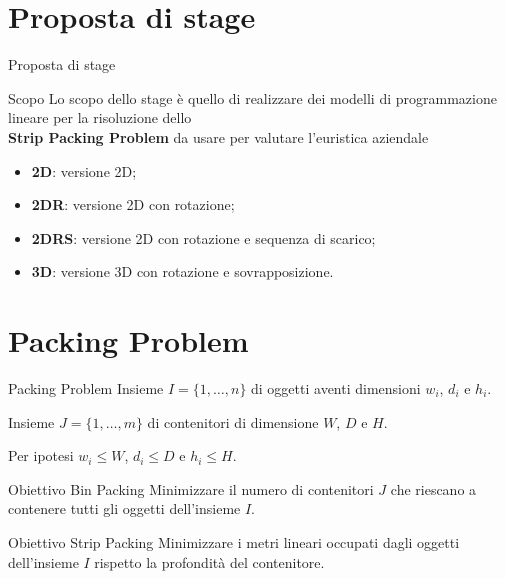 \documentclass{beamer}
\begin{document}
\section{Proposta di stage}

\begin{frame}{Proposta di stage}
	\begin{alertblock}{Scopo}
		Lo scopo dello stage \`e  quello di realizzare dei modelli di programmazione lineare per la risoluzione dello \\ \textbf{Strip Packing Problem} da usare per valutare l'euristica aziendale
	\end{alertblock}
	\begin{itemize}
		\item \textbf{2D}: versione 2D;
		\item \textbf{2DR}: versione 2D con rotazione;
		\item \textbf{2DRS}: versione 2D con rotazione e sequenza di scarico;
		\item \textbf{3D}: versione 3D con rotazione e sovrapposizione.
	\end{itemize}
\end{frame}

\section{Packing Problem}
\begin{frame}{Packing Problem}
	Insieme $I = \{1,\dots,n\}$ di oggetti aventi dimensioni $w_{i}$, $d_{i}$ e $h_{i}$.	
														
	Insieme $J = \{1,\dots,m\}$ di contenitori di dimensione $W$, $D$ e $H$.
												
	Per ipotesi $w_{i} \leq W$, $d_{i} \leq D$ e $h_{i} \leq H$.
	\vspace{.5em}
	\begin{minipage}[c]{0.45\textwidth}
		\begin{alertblock}{Obiettivo Bin Packing}
			Minimizzare il numero di contenitori $J$ che riescano a contenere tutti gli oggetti dell'insieme $I$.
		\end{alertblock}	
	\end{minipage}
	\hfill
	\begin{minipage}[c]{0.45\textwidth}
		\begin{alertblock}{Obiettivo Strip Packing}
			Minimizzare i metri lineari occupati dagli oggetti dell'insieme $I$ rispetto la profondit\`a del contenitore.
		\end{alertblock}	
	\end{minipage}
\end{frame}
\end{document}
